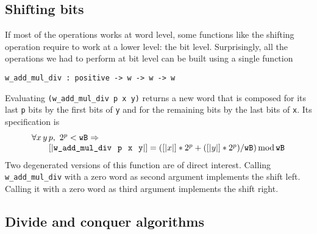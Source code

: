 \subsection{Shifting bits}

If most of the operations works at word level, some functions like the
shifting operation require to work at a lower level: the bit level.
Surprisingly, all the operations we had to perform at bit level can be built
using a single function
\begin{verbatim}
w_add_mul_div : positive -> w -> w -> w
\end{verbatim}
Evaluating  {\tt (w\_add\_mul\_div p x y)} returns a new word that
is composed for its last {\tt p} bits by the first bits of {\tt y}
and for the remaining bits by the last bits of {\tt x}.
Its specification is 
$$\begin{array}{l}
\forall x\, y\, p, \,\, 2 ^ p < {\texttt{wB}}  \Rightarrow \\
\hskip20pt [|\textit{\tt{w\_add\_mul\_div}\, p\, x\, y}|] = ([|x|] * 2 ^ p + ([|y|] * 2 ^ p) / {\texttt{wB}}) \,\mbox{mod}\, {\texttt{wB}}
\end{array}
$$
Two degenerated versions of this function are of direct interest. Calling
{\tt w\_add\_mul\_div} with a zero word as second argument implements
the shift left. Calling it with a zero word as third argument implements
the shift right.

\subsection{Divide and conquer algorithms}

